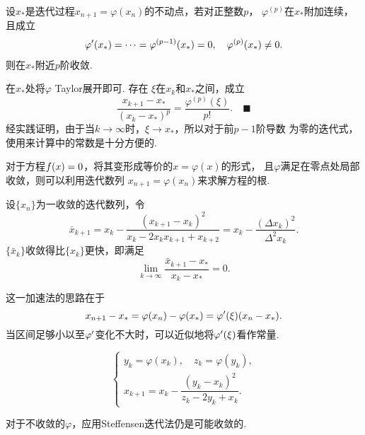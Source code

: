   \begin{thm}[$p$阶收敛条件]
    \label{thm: p阶收敛条件}
    设$x_*$是迭代过程$x_{n+1}=\varphi(x_n)$的不动点，若对正整数$p$，
    $\varphi^{(p)}$在$x_*$附加连续，且成立
    \[\begin{split}
      \varphi^\prime(x_*) = \cdots = \varphi^{(p-1)}(x_*) = 0,\quad
      \varphi^{(p)}(x_*) \ne 0.
    \end{split}\]
    则在$x_*$附近$p$阶收敛.
  \end{thm}
  \proof
    在$x_*$处将$\varphi$ Taylor展开即可. 存在
    $\xi$在$x_k$和$x_*$之间，成立
    \begin{equation}
      \label{equ: 导数为零情况余项}
      \frac{x_{k+1}-x_*}{(x_k-x_*)^p} = \frac{\varphi^{(p)}(\xi)}{p!}.
      \quad\blacksquare
    \end{equation}
  \remark
    经实践证明，由于当$k\to\infty$时，$\xi\to x_*$，所以对于前$p-1$阶导数
    为零的迭代式，使用来计算中的常数是十分方便的.


  \begin{alg}[不动点法]
    对于方程$\mathnormal{f}(x) = 0$，将其变形成等价的$x=\varphi(x)$的形式，
    且$\varphi$满足在零点处局部收敛，则可以利用迭代数列
    $x_{n+1} = \varphi(x_n)$来求解方程的根.
  \end{alg}

  \begin{alg}
    设$\{x_n\}$为一收敛的迭代数列，令
    \[
      \bar{x}_{k+1} = x_k - \frac{(x_{k+1}-x_k)^2}{x_k-2x_kx_{k+1}+x_{k+2}}
      = x_k - \frac{(\Delta x_k)^2}{\Delta^2x_k}.
    \]
    $\{\bar{x}_k\}$收敛得比$\{x_k\}$更快，即满足
    \[
      \lim_{k\to\infty}\frac{\bar{x}_{k+1}-x_*}{x_k-x_*} = 0.
    \]
  \end{alg}
  \remark
    这一加速法的思路在于
    \[
      x_{n+1}-x_* = \varphi(x_n) - \varphi(x_*) = \varphi^\prime(\xi)(x_n-x_*).
    \]
    当区间足够小以至$\varphi^\prime$变化不大时，可以近似地将$\varphi^\prime(\xi)$看作常量.

  \begin{alg}[Steffensen迭代法]
    \[\begin{cases}
      y_k = \varphi(x_k),\quad z_k = \varphi(y_k), \\
      x_{k+1} = x_k - \dfrac{(y_k-x_k)^2}{z_k-2y_k+x_k}.
    \end{cases}\]
  \end{alg}
  \remark
    对于不收敛的$\varphi$，应用Steffensen迭代法仍是可能收敛的.

